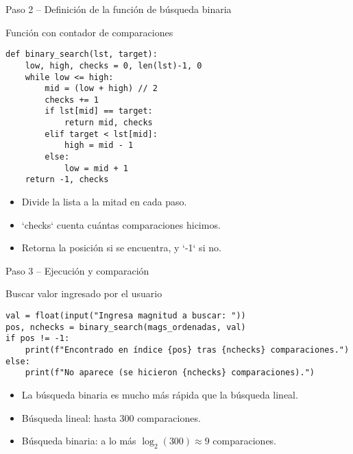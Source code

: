 \documentclass[10pt]{beamer}
\begin{document}
\begin{frame}[fragile]{Paso 2 – Definición de la función de búsqueda binaria}
  \begin{block}{Función con contador de comparaciones}
  \begin{verbatim}
def binary_search(lst, target):
    low, high, checks = 0, len(lst)-1, 0
    while low <= high:
        mid = (low + high) // 2
        checks += 1
        if lst[mid] == target:
            return mid, checks
        elif target < lst[mid]:
            high = mid - 1
        else:
            low = mid + 1
    return -1, checks
  \end{verbatim}
  \end{block}

  \begin{itemize}
    \item Divide la lista a la mitad en cada paso.
    \item `checks` cuenta cuántas comparaciones hicimos.
    \item Retorna la posición si se encuentra, y `-1` si no.
  \end{itemize}
\end{frame}


\begin{frame}[fragile]{Paso 3 – Ejecución y comparación}
  \begin{block}{Buscar valor ingresado por el usuario}
  \begin{verbatim}
val = float(input("Ingresa magnitud a buscar: "))
pos, nchecks = binary_search(mags_ordenadas, val)
if pos != -1:
    print(f"Encontrado en índice {pos} tras {nchecks} comparaciones.")
else:
    print(f"No aparece (se hicieron {nchecks} comparaciones).")
  \end{verbatim}
  \end{block}

  \begin{itemize}
    \item La búsqueda binaria es mucho más rápida que la búsqueda lineal.
    \item Búsqueda lineal: hasta 300 comparaciones.
    \item Búsqueda binaria: a lo más \( \log_2(300) \approx 9 \) comparaciones.
  \end{itemize}
\end{frame}
\end{document}
